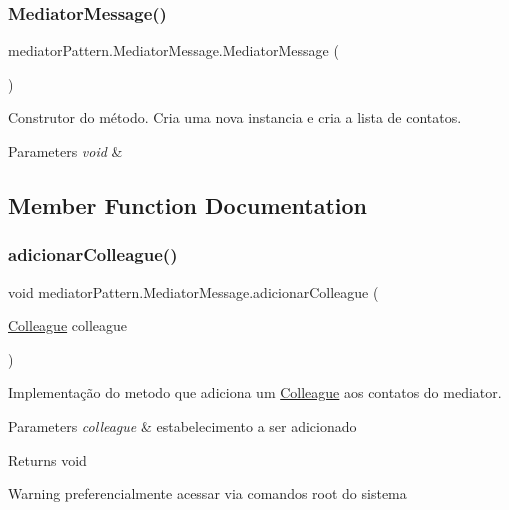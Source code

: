\subsubsection{\texorpdfstring{MediatorMessage()}{MediatorMessage()}}
{\footnotesize\ttfamily mediator\+Pattern.\+Mediator\+Message.\+Mediator\+Message (\begin{DoxyParamCaption}{ }\end{DoxyParamCaption})}



Construtor do método. Cria uma nova instancia e cria a lista de contatos. 


\begin{DoxyParams}{Parameters}
{\em void} & \\
\hline
\end{DoxyParams}


\subsection{Member Function Documentation}
\mbox{\label{classmediator_pattern_1_1_mediator_message_ab90489c21ee0b6ac6cfd31485a1ab627}} 
\subsubsection{\texorpdfstring{adicionarColleague()}{adicionarColleague()}}
{\footnotesize\ttfamily void mediator\+Pattern.\+Mediator\+Message.\+adicionar\+Colleague (\begin{DoxyParamCaption}\item[{\mbox{\hyperlink{classmediator_pattern_1_1_colleague}{Colleague}}}]{colleague }\end{DoxyParamCaption})}



Implementação do metodo que adiciona um \mbox{\hyperlink{classmediator_pattern_1_1_colleague}{Colleague}} aos contatos do mediator. 


\begin{DoxyParams}{Parameters}
{\em colleague} & estabelecimento a ser adicionado \\
\hline
\end{DoxyParams}
\begin{DoxyReturn}{Returns}
void 
\end{DoxyReturn}
\begin{DoxyWarning}{Warning}
preferencialmente acessar via comandos root do sistema 
\end{DoxyWarning}
\mbox{\label{classmediator_pattern_1_1_mediator_message_a33d287de4248954e4a9bfeaf8f1de626}} 
